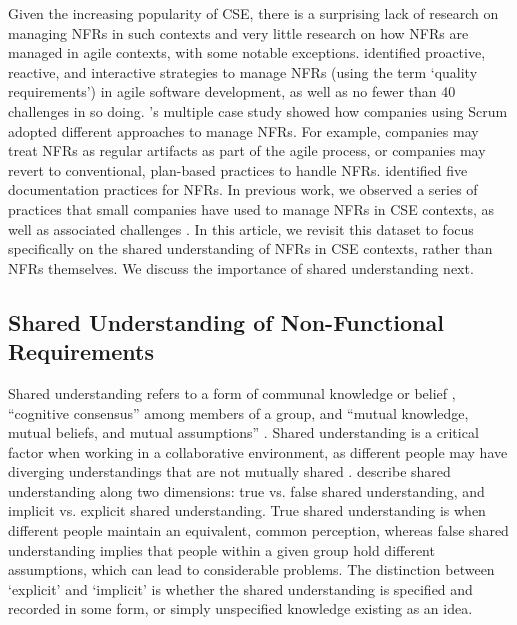 \documentclass[smallextended]{svjour3}        %
\begin{document}
Given the increasing popularity of CSE, there is a surprising lack of research on managing NFRs in such contexts and very little research on how NFRs are managed in agile contexts, with some notable exceptions. \cite{karhapaa2021strategies} identified proactive, reactive, and interactive strategies to manage NFRs (using the term `quality requirements') in agile software development, as well as no fewer than 40 challenges in so doing. 
\cite{rahy2022managing}'s multiple case study showed how companies using Scrum adopted different approaches to manage NFRs. For example, companies may treat NFRs as regular artifacts as part of the agile process, or companies may revert to conventional, plan-based practices to handle NFRs. \cite{nasir2023exploratory} identified five documentation practices for NFRs.
In previous work, we observed a series of practices that small companies have used to manage NFRs in CSE contexts, as well as associated challenges \citep{werner_tse_2021}.  
In this article, we revisit this dataset to focus specifically on the shared understanding of NFRs in CSE contexts, rather than NFRs themselves. We discuss the importance of shared understanding next.



\subsection{Shared Understanding of Non-Functional Requirements}
Shared understanding refers to a form of communal knowledge or belief \citep{glinz_shared_2015}, 
 ``cognitive consensus''
\citep{kleinsmann2010understanding} among members of a group, and ``mutual knowledge, mutual beliefs, and mutual assumptions'' \citep{clark1991grounding}.
Shared understanding is a critical factor when working in a collaborative environment, 
as different people may have diverging understandings that are not mutually shared \citep{bittner2014creating}.
\cite{glinz_shared_2015} describe shared understanding along two dimensions: true vs. false shared understanding, and implicit vs. explicit shared understanding. 
True shared understanding is when different people maintain an equivalent, common perception, whereas false shared understanding implies that people within a given group hold different assumptions, which can lead to considerable problems. 
The distinction between `explicit' and `implicit' is whether the shared understanding is specified and recorded in some form, or simply unspecified knowledge existing as an idea.
\end{document}

